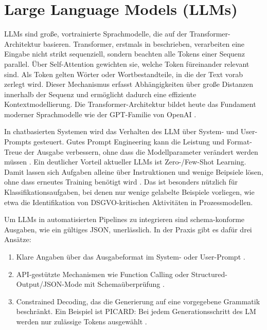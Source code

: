 \section{Large Language Models (LLMs)}\label{sec:llms}

\acp{LLM} sind große, vortrainierte Sprachmodelle, die auf der Transformer-Architektur basieren. Transformer, erstmals in \cite{vaswani2017attention} beschrieben, verarbeiten eine Eingabe nicht strikt sequenziell, sondern beachten alle Tokens einer Sequenz parallel. Über Self-Attention gewichten sie, welche Token füreinander relevant sind. Als Token gelten Wörter oder Wortbestandteile, in die der Text vorab zerlegt wird. Dieser Mechanismus erfasst Abhängigkeiten über große Distanzen innerhalb der Sequenz und ermöglicht dadurch eine effiziente Kontextmodellierung. Die Transformer-Architektur bildet heute das Fundament moderner Sprachmodelle wie der GPT-Familie von OpenAI \cite{ibm-gpt, minaee2025largelanguagemodelssurvey, openai-models}.

In chatbasierten Systemen wird das Verhalten des \ac{LLM} über System- und User-Prompts gesteuert. Gutes Prompt Engineering kann die Leistung und Format-Treue der Ausgabe verbessern, ohne dass die Modellparameter verändert werden müssen \cite{liu2023prompting}. Ein deutlicher Vorteil aktueller \acp{LLM} ist Zero-/Few-Shot Learning. Damit lassen sich Aufgaben alleine über Instruktionen und wenige Beipsiele lösen, ohne dass erneutes Training benötigt wird \cite{brown2020fewshot, liu2023prompting}. Das ist besonders nützlich für Klassifikationsaufgaben, bei denen nur wenige gelabelte Beispiele vorliegen, wie etwa die Identifikation von \ac{DSGVO}-kritischen Aktivitäten in Prozessmodellen.

Um \acp{LLM} in automatisierten Pipelines zu integrieren sind schema-konforme Ausgaben, wie ein gültiges JSON, unerlässlich. In der Praxis gibt es dafür drei Ansätze:

\begin{enumerate}
    \item Klare Angaben über das Ausgabeformat im System- oder User-Prompt \cite{liu2023prompting}.
    \item API-gestützte Mechanismen wie Function Calling oder Structured-Output/JSON-Mode mit Schemaüberprüfung \cite{mistralai_structured_output, openai_function_calling_2023, openai_structured_output}.
    \item Constrained Decoding, das die Generierung auf eine vorgegebene Grammatik beschränkt. Ein Beispiel ist PICARD: Bei jedem Generationsschritt des \ac{LM} werden nur zulässige Tokens ausgewählt \cite{scholak2021picard}.
\end{enumerate}


